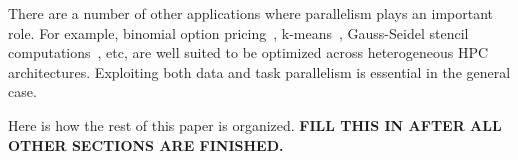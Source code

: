 There are a number of other applications where parallelism plays an
important
role. %
For example, binomial option pricing~\cite{ssol10,hpra10},
k-means~\cite{jzha11}, Gauss-Seidel stencil computations~\cite{hcou09},
etc, are well suited to be optimized across heterogeneous HPC
architectures. Exploiting both data and task parallelism is essential in
the general case.

Here is how the rest of this paper is organized. \textbf{FILL THIS 
IN AFTER ALL OTHER SECTIONS ARE FINISHED.}





